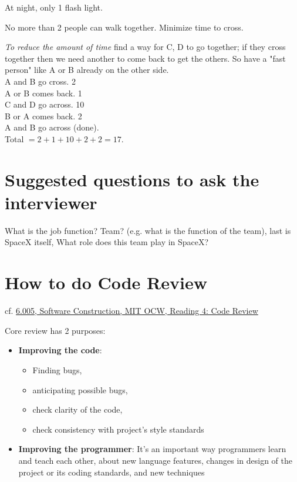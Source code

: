 \documentclass[10pt]{amsart}
\begin{document}
At night, only 1 flash light.

No more than 2 people can walk together. Minimize time to cross.

\emph{To reduce the amount of time} find a way for C, D to go together; if they cross together then we need another to come back to get the others. So have a "fast person" like A or B already on the other side. \\

A and B go cross. 2 \\
A or B comes back. 1 \\
C and D go across. 10 \\
B or A comes back. 2 \\
A and B go across (done). \\

Total $ = 2 + 1 + 10 + 2 + 2 = 17$.


\section{Suggested questions to ask the interviewer}

What is the job function? Team? (e.g. what is the function of the team), last is SpaceX itself, What role does this team play in SpaceX?

\section{How to do Code Review}

cf. \href{https://ocw.mit.edu/ans7870/6/6.005/s16/classes/04-code-review/index.html}{6.005, Software Construction, MIT OCW, Reading 4: Code Review}

Core review has 2 purposes:
\begin{itemize}
	\item \textbf{Improving the code}:
	\begin{itemize}
		\item Finding bugs,
		\item anticipating possible bugs,
		\item check clarity of the code,
		\item check consistency with project's style standards
	\end{itemize}
	\item \textbf{Improving the programmer}: It's an important way programmers learn and teach each other, about new language features, changes in design of the project or its coding standards, and new techniques
\end{itemize}
\end{document}
